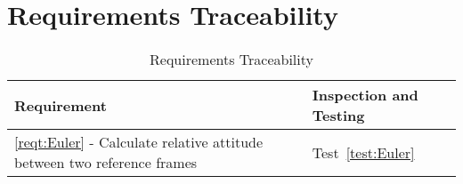 \section{Requirements Traceability}

\begin{longtable}[c]{||p{3.5in}|p{3.5in}|}
\caption{Requirements Traceability} \\[6pt]
\hline
{\bf Requirement} & {\bf Inspection and Testing} \\ 
\hline \hline
\endhead
\ref{reqt:Euler} - Calculate relative attitude between two reference frames &
  Test~\ref{test:Euler} \\ \hline
\end{longtable}

